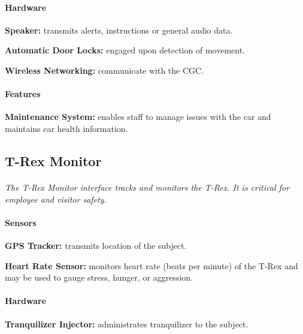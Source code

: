 \documentclass[12pt]{article}
\begin{document}
	\paragraph{Hardware}
	\begin{list}{}{}
		\item \textbf{Speaker:} transmits alerts, instructions or general audio data.
		\item \textbf{Automatic Door Locks:} engaged upon detection of movement. %
		\item \textbf{Wireless Networking:} communicate with the CGC.
	\end{list}
	
	\paragraph{Features}
	\begin{list}{}{}
		\item \textbf{Maintenance System:} enables staff to manage issues with the car 
		and 	maintains car health information.
	\end{list}

	\subsection{T-Rex Monitor}
	\paragraph{} \textit{The T-Rex Monitor interface tracks and monitors the T-Rex. It is 
	critical for employee and visitor safety.}
	\paragraph{Sensors}
	\begin{list}{}{}
		\item \textbf{GPS Tracker:} transmits location of the subject.
		\item \textbf{Heart Rate Sensor:} monitors heart rate (beats per minute) of the T-Rex
		and may be used to gauge stress, hunger, or aggression.
	\end{list}
		
	\paragraph{Hardware}
	\begin{list}{}{}
		\item \textbf{Tranquilizer Injector:} administrates tranquilizer to the subject.
	\end{list}
\end{document}
